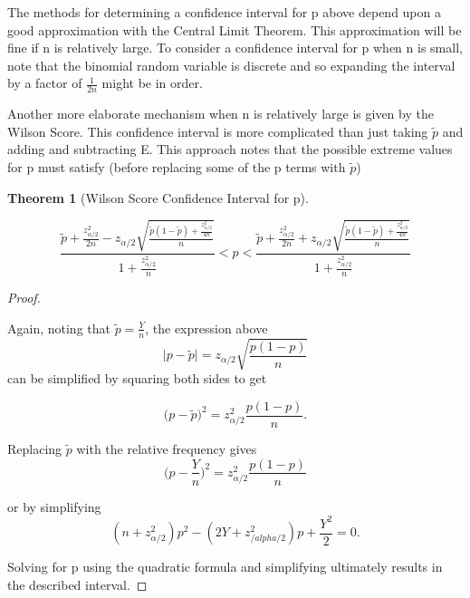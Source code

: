 \documentclass[10pt,]{book}
\theoremstyle{plain}
\newtheorem{theorem}{Theorem}[section]
\theoremstyle{definition}
\theoremstyle{definition}
\theoremstyle{definition}
\numberwithin{equation}{section}
\newcommand{\lt}{ < }
\begin{document}
The methods for determining a confidence interval for p above depend upon a good approximation with the Central Limit Theorem. This approximation will be fine if n is relatively large. To consider a confidence interval for p when n is small, note that the binomial random variable is discrete and so expanding the interval by a factor of \(\frac{1}{2n}\) might be in order.
%
\par

Another more elaborate mechanism when n is relatively large is given by the Wilson Score. This confidence interval is more complicated than just taking \(\tilde{p}\) and adding and subtracting E. This approach notes that the possible extreme values for p must satisfy (before replacing some of the p terms with \(\tilde{p}\))
\par


\begin{theorem}[{Wilson Score Confidence Interval for p}]\label{theorem-67}

\begin{equation*}\frac{\tilde{p} + \frac{z_{\alpha/2}^2}{2n} - z_{\alpha/2} \sqrt{\frac{\tilde{p}(1-\tilde{p}) + \frac{z_{\alpha/2}^2}{4n}}{n}}}{1 + \frac{z_{\alpha/2}^2}{n}} \lt p \lt \frac{\tilde{p} + \frac{z_{\alpha/2}^2}{2n} + z_{\alpha/2} \sqrt{\frac{\tilde{p}(1-\tilde{p}) + \frac{z_{\alpha/2}^2}{4n}}{n}}}{1 + \frac{z_{\alpha/2}^2}{n}}
\end{equation*}
%
\end{theorem}
\begin{proof}\hypertarget{proof-63}{}
Again, noting that \(\tilde{p} = \frac{Y}{n}\), the expression above
\begin{equation*} \big | p - \tilde{p} \big | = z_{\alpha /2} \sqrt{\frac{p(1-p)}{n}}\end{equation*}
can be simplified by squaring both sides to get

\begin{equation*} \big ( p - \tilde{p} \big )^2 = z_{\alpha /2}^2 \frac{p(1-p)}{n}.\end{equation*}

Replacing \(\tilde{p}\) with the relative frequency gives
\begin{equation*} \big ( p - \frac{Y}{n} \big )^2 = z_{\alpha /2}^2 \frac{p(1-p)}{n}\end{equation*}

or by simplifying
\begin{equation*}(n+z_{\alpha /2}^2 )p^2 - (2Y+z_{/alpha /2}^2) p + \frac{Y^2}{2} = 0.\end{equation*}

Solving for p using the quadratic formula and simplifying ultimately results in the described interval.
%
\end{proof}
\end{document}
